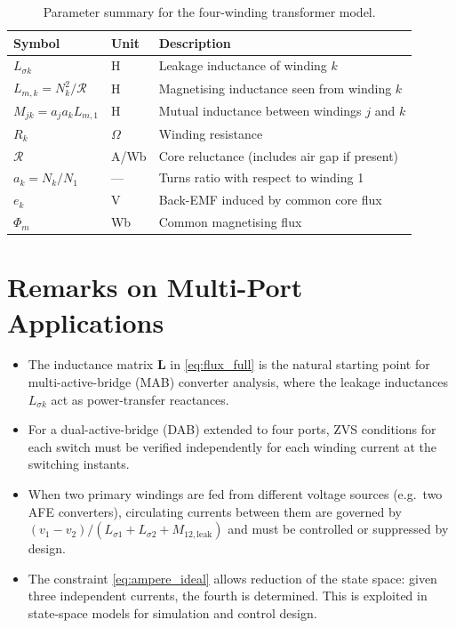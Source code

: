 \documentclass[11pt,a4paper]{article}
\newcommand{\mat}[1]{\mathbf{#1}}
\newcommand{\Rel}{\mathcal{R}}          %
\begin{document}
\begin{table}[h!]
  \centering
  \caption{Parameter summary for the four-winding transformer model.}
  \label{tab:parameters}
  \renewcommand{\arraystretch}{1.35}
  \begin{tabular}{@{} l l l @{}}
    \toprule
    \textbf{Symbol} & \textbf{Unit} & \textbf{Description} \\
    \midrule
    $L_{\sigma k}$        & H         & Leakage inductance of winding $k$ \\
    $L_{m,k} = N_k^2/\Rel$ & H       & Magnetising inductance seen from winding $k$ \\
    $M_{jk} = a_j a_k L_{m,1}$ & H   & Mutual inductance between windings $j$ and $k$ \\
    $R_k$                 & $\Omega$  & Winding resistance \\
    $\Rel$                & A/Wb      & Core reluctance (includes air gap if present) \\
    $a_k = N_k/N_1$       & —         & Turns ratio with respect to winding 1 \\
    $e_k$                 & V         & Back-EMF induced by common core flux \\
    $\Phi_m$              & Wb        & Common magnetising flux \\
    \bottomrule
  \end{tabular}
\end{table}

\section{Remarks on Multi-Port Applications}

\begin{itemize}
  \item The inductance matrix $\mat{L}$ in \eqref{eq:flux_full} is the natural
        starting point for multi-active-bridge (MAB) converter analysis, where
        the leakage inductances $L_{\sigma k}$ act as power-transfer reactances.
  \item For a dual-active-bridge (DAB) extended to four ports, ZVS conditions
        for each switch must be verified independently for each winding current
        at the switching instants.
  \item When two primary windings are fed from different voltage sources
        (e.g.\ two AFE converters), circulating currents between them are
        governed by $(v_1 - v_2)/( L_{\sigma 1} + L_{\sigma 2} + M_{12,\text{leak}})$
        and must be controlled or suppressed by design.
  \item The constraint \eqref{eq:ampere_ideal} allows reduction of the state
        space: given three independent currents, the fourth is determined.
        This is exploited in state-space models for simulation and control
        design.
\end{itemize}
\end{document}
